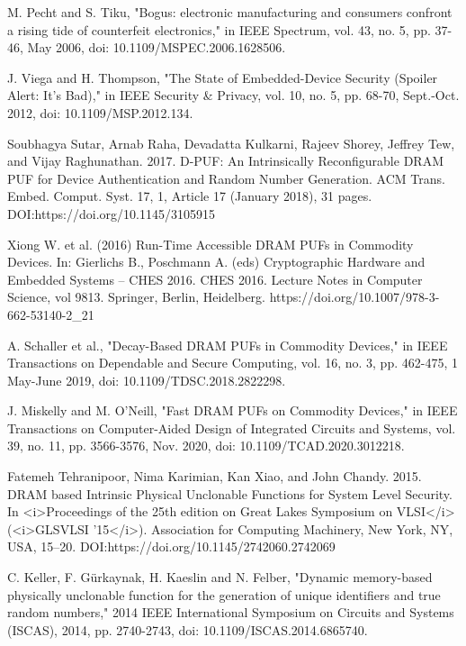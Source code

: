 \documentclass[journal, a4paper]{IEEEtran}
\begin{document}
\begin{thebibliography}{1}

    M. Pecht and S. Tiku, "Bogus: electronic manufacturing and consumers confront a rising tide of counterfeit electronics," in IEEE Spectrum, vol. 43, no. 5, pp. 37-46, May 2006, doi: 10.1109/MSPEC.2006.1628506.

    J. Viega and H. Thompson, "The State of Embedded-Device Security (Spoiler Alert: It's Bad)," in IEEE Security \& Privacy, vol. 10, no. 5, pp. 68-70, Sept.-Oct. 2012, doi: 10.1109/MSP.2012.134.

    Soubhagya Sutar, Arnab Raha, Devadatta Kulkarni, Rajeev Shorey, Jeffrey Tew, and Vijay Raghunathan. 2017. D-PUF: An Intrinsically Reconfigurable DRAM PUF for Device Authentication and Random Number Generation. ACM Trans. Embed. Comput. Syst. 17, 1, Article 17 (January 2018), 31 pages. DOI:https://doi.org/10.1145/3105915

    Xiong W. et al. (2016) Run-Time Accessible DRAM PUFs in Commodity Devices. In: Gierlichs B., Poschmann A. (eds) Cryptographic Hardware and Embedded Systems – CHES 2016. CHES 2016. Lecture Notes in Computer Science, vol 9813. Springer, Berlin, Heidelberg. https://doi.org/10.1007/978-3-662-53140-2\_21

    A. Schaller et al., "Decay-Based DRAM PUFs in Commodity Devices," in IEEE Transactions on Dependable and Secure Computing, vol. 16, no. 3, pp. 462-475, 1 May-June 2019, doi: 10.1109/TDSC.2018.2822298.

    J. Miskelly and M. O’Neill, "Fast DRAM PUFs on Commodity Devices," in IEEE Transactions on Computer-Aided Design of Integrated Circuits and Systems, vol. 39, no. 11, pp. 3566-3576, Nov. 2020, doi: 10.1109/TCAD.2020.3012218.

    Fatemeh Tehranipoor, Nima Karimian, Kan Xiao, and John Chandy. 2015. DRAM based Intrinsic Physical Unclonable Functions for System Level Security. In <i>Proceedings of the 25th edition on Great Lakes Symposium on VLSI</i> (<i>GLSVLSI '15</i>). Association for Computing Machinery, New York, NY, USA, 15–20. DOI:https://doi.org/10.1145/2742060.2742069

    C. Keller, F. Gürkaynak, H. Kaeslin and N. Felber, "Dynamic memory-based physically unclonable function for the generation of unique identifiers and true random numbers," 2014 IEEE International Symposium on Circuits and Systems (ISCAS), 2014, pp. 2740-2743, doi: 10.1109/ISCAS.2014.6865740.


\end{thebibliography}
\end{document}
